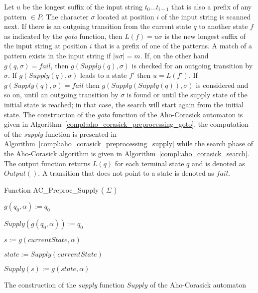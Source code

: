 \documentclass{ws-ijait}
\begin{document}
Let $u$ be the longest suffix of the input string $t_0\ldots t_{i-1}$ that is also a prefix of any pattern $\in P$. The character $\sigma$ located at position $i$ of the input string is scanned next. If there is an outgoing transition from the current state $q$ to another state $f$ as indicated by the \textit{goto} function, then $L(f) = u\sigma$ is the new longest suffix of the input string at position $i$ that is a prefix of one of the patterns. A match of a pattern exists in the input string if $|u\sigma| = m$. If, on the other hand $g(q, \sigma) = fail$, then $g(Supply(q), \sigma)$ is checked for an outgoing transition by $\sigma$. If $g(Supply(q), \sigma)$ leads to a state $f'$ then $u = L(f')$. If $g(Supply(q), \sigma) = fail$ then $g(Supply(Supply(q)), \sigma)$ is considered and so on, until an outgoing transition by $\sigma$ is found or until the supply state of the initial state is reached; in that case, the search will start again from the initial state. The construction of the \textit{goto} function of the Aho-Corasick automaton is given in Algorithm~\ref{compl:aho_corasick_preprocessing_goto}, the computation of the \textit{supply} function is presented in Algorithm~\ref{compl:aho_corasick_preprocessing_supply} while the search phase of the Aho-Corasick algorithm is given in Algorithm~\ref{compl:aho_corasick_search}. The output function returns $L(q)$ for each terminal state $q$ and is denoted as $Output()$. A transition that does not point to a state is denoted as $fail$.

\begin{algorithm}[H]

Function AC\_Preproc\_Supply ( $\Sigma$ )\\

\ForAll{ $\alpha \in \Sigma$ } {


	 {
		$g(q_0, \alpha) := q_0$\\
	}{
	
		$Supply(g(q_0, \alpha)) := q_0$\\
	
	}
}

 {

	\ForAll{ $\alpha \in \Sigma$ } {

		$s := g(currentState, \alpha)$\\
		
		 {

			$state := Supply(currentState)$\\
		
			
			$Supply(s) := g(state, \alpha)$\\
		}
	}
}

\caption{The construction of the \textit{supply} function $Supply$ of the Aho-Corasick automaton}
\label{compl:aho_corasick_preprocessing_supply}
\end{algorithm}
\end{document}
